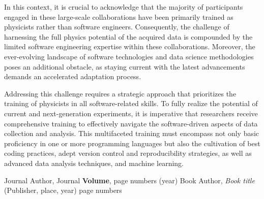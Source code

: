 \documentclass[]{webofc}
\begin{document}
In this context, it is crucial to acknowledge that the majority of participants engaged in these large-scale collaborations have been primarily trained as physicists rather than software engineers. Consequently, the challenge of harnessing the full physics potential of the acquired data is compounded by the limited software engineering expertise within these collaborations. Moreover, the ever-evolving landscape of software technologies and data science methodologies poses an additional obstacle, as staying current with the latest advancements demands an accelerated adaptation process.

Addressing this challenge requires a strategic approach that prioritizes the training of physicists in all software-related skills. To fully realize the potential of current and next-generation experiments, it is imperative that researchers receive comprehensive training to effectively navigate the software-driven aspects of data collection and analysis. This multifaceted training must encompass not only basic proficiency in one or more programming languages but also the cultivation of best coding practices, adept version control and reproducibility strategies, as well as advanced data analysis techniques, and machine learning.
%
\begin{thebibliography}{}
%
%
Journal Author, Journal \textbf{Volume}, page numbers (year)
Book Author, \textit{Book title} (Publisher, place, year) page numbers
\end{thebibliography}
\end{document}
